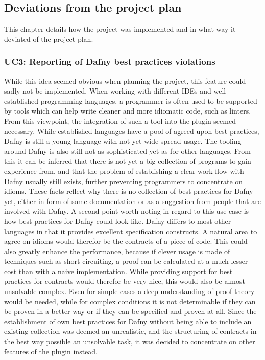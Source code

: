 \subsection{Deviations from the project plan}\label{projectCourse}
This chapter details how the project was implemented and in what way it deviated of the project plan.
\subsubsection{UC3: Reporting of Dafny best practices violations}
While this idea seemed obvious when planning the project, this feature could sadly not be implemented. When working with different IDEs and well established programming languages, a programmer is often used to be supported by tools which can help write cleaner and more idiomatic code, such as linters. From this viewpoint, the integration of such a tool into the plugin seemed necessary. \newline
While established languages have a pool of agreed upon best practices, Dafny is still a young language with not yet wide spread usage. The tooling around Dafny is also still not as sophisticated yet as for other languages. From this it can be inferred that there is not yet a big collection of programs to gain experience from, and that the problem of establishing a clear work flow with Dafny usually still exists, further preventing programmers to concentrate on idioms. \newline
These facts reflect why there is no collection of best practices for Dafny yet, either in form of some documentation or as a suggestion from people that are involved with Dafny. \newline
A second point worth noting in regard to this use case is how best practices for Dafny could look like. Dafny differs to most other languages in that it provides excellent specification constructs. A natural area to agree on idioms would therefor be the contracts of a piece of code. This could also greatly enhance the performance, because if clever usage is made of techniques such as short circuiting, a proof can be calculated at a much lesser cost than with a naive implementation. \newline
While providing support for best practices for contracts would therefor be very nice, this would also be almost unsolvable complex. Even for simple cases a deep understanding of proof theory would be needed, while for complex conditions it is not determinable if they can be proven in a better way or if they can be specified and proven at all. \newline
Since the establishment of own best practices for Dafny without being able to include an existing collection was deemed an unrealistic, and the structuring of contracts in the best way possible an unsolvable task, it was decided to concentrate on other features of the plugin instead.
